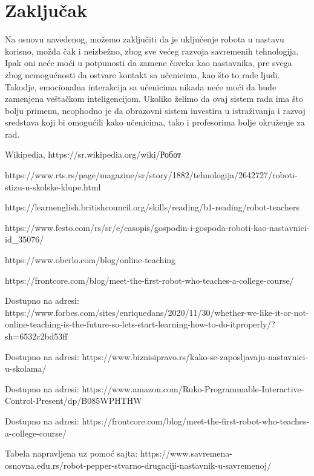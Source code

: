 \documentclass[a4paper]{article}
\begin{document}
\section{Zaključak}
\label{sec:zakljucak}

Na osnovu navedenog, možemo zaključiti da je uključenje robota u nastavu korisno, možda čak i neizbežno, zbog sve većeg razvoja savremenih tehnologija. Ipak oni neće moći u potpunosti da zamene čoveka kao nastavnika, pre svega zbog nemogućnosti da ostvare kontakt sa učenicima, kao što to rade ljudi. Takodje, emocionalna interakcija sa učenicima nikada neće moći da bude zamenjena veštačkom inteligencijom. Ukoliko želimo da ovaj sistem rada ima što bolju primenu, neophodno je da obrazovni sistem investira u istraživanja i razvoj sredstava koji bi omogućili kako učenicima, tako i profesorima bolje okruženje za rad.

\newpage
{}
\appendix

\begin{thebibliography}{9}

\bibitem{}Wikipedia, https://sr.wikipedia.org/wiki/Робот

\bibitem{}https://www.rts.rs/page/magazine/sr/story/1882/tehnologija/2642727/roboti-stizu-u-skolske-klupe.html

\bibitem{}https://learnenglish.britishcouncil.org/skills/reading/b1-reading/robot-teachers

\bibitem{}https://www.festo.com/rs/sr/e/casopis/gospodin-i-gospoda-roboti-kao-nastavnici-id\_35076/

\bibitem{}https://www.oberlo.com/blog/online-teaching

\bibitem{}https://frontcore.com/blog/meet-the-first-robot-who-teaches-a-college-course/

Dostupno na adresi: 
https://www.forbes.com/sites/enriquedans/2020/11/30/whether-we-like-it-or-not-online-teaching-is-the-future-so-lets-start-learning-how-to-do-itproperly/?sh=6532c2bd53ff

Dostupno na adresi: https://www.biznisipravo.rs/kako-se-zaposljavaju-nastavnici-u-skolama/

Dostupno na adresi: https://www.amazon.com/Ruko-Programmable-Interactive-Control-Present/dp/B085WPHTHW

 Dostupno na adresi: https://frontcore.com/blog/meet-the-first-robot-who-teaches-a-college-course/

Tabela napravljena uz pomoć sajta: https://www.savremena-osnovna.edu.rs/robot-pepper-stvarno-drugaciji-nastavnik-u-savremenoj/

\end{thebibliography}
\end{document}
